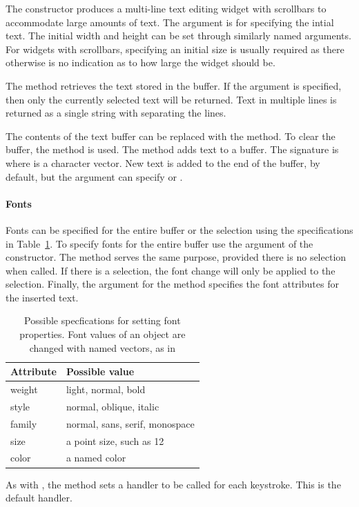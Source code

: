 The  constructor produces a multi-line text editing
widget with scrollbars to accommodate large amounts of text. The
 argument is for specifying the intial text. The
initial width and height can be set through similarly named
arguments. For widgets with scrollbars, specifying an initial size is
usually required as there otherwise is no indication as to how large
the widget should be.

The  method retrieves the text stored in the
buffer. If the argument  is specified, then only the
currently selected text will be returned. Text in multiple lines is
returned as a single string with \qcode{\backslashn} separating the lines.

The contents of the text buffer can be replaced with the
 method. To clear the buffer, the
 method is used. The 
method adds text to a buffer. The signature is 
where  is a character vector. New text is added to the end
of the buffer, by default, but the  argument
can specify  or .





\paragraph{Fonts}
Fonts can be specified for the entire buffer or the selection using
the specifications in Table~\ref{tab:gWidgets-font-properties}. To
specify fonts for the entire buffer use the
 argument of the constructor. The
 method serves the same purpose, provided
there is no selection when called. If there is a selection, the font
change will only be applied to the selection. Finally, the
 argument for the  method
specifies the font attributes for the inserted text.



\begin{table}
\centering
\label{tab:gWidgets-font-properties}
\caption{Possible specfications for setting font properties. Font values of an object are changed with named vectors, as in }
\begin{tabular}{@{}lp{}@{}}
\toprule

Attribute&Possible value\\
\midrule
weight&light, normal, bold\\style&normal, oblique, italic\\family&normal, sans, serif, monospace\\size&a point size, such as 12\\color&a named color
\\ \bottomrule
\end{tabular}
\end{table}
As with , the  method
sets a handler to be called for each keystroke. This is the default
handler.


